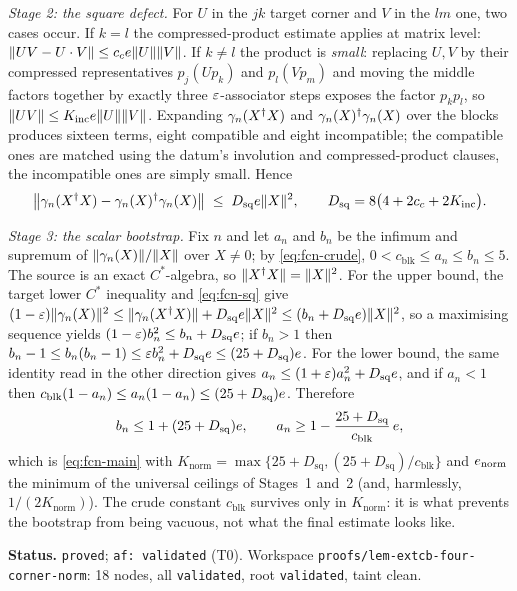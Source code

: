 \emph{Stage 2: the square defect.} For $U$ in the $jk$ target corner and $V$ in the $lm$
one, two cases occur. If $k=l$ the compressed-product estimate applies at matrix level:
$\lVert UV-U\mathbin{\cdot} V\rVert\le c_ce\lVert U\rVert\lVert V\rVert$. If $k\ne l$ the product is \emph{small}:
replacing $U,V$ by their compressed representatives $p_j(Up_k)$ and $p_l(Vp_m)$ and moving
the middle factors together by exactly three $\varepsilon$-associator steps exposes the factor
$p_kp_l$, so $\lVert UV\rVert\le K_{\mathrm{inc}}e\lVert U\rVert\lVert V\rVert$. Expanding
$\gamma_n(X^{\dagger} X)$ and $\gamma_n(X)^{\dagger}\gamma_n(X)$ over the blocks produces sixteen terms,
eight compatible and eight incompatible; the compatible ones are matched using the datum's
involution and compressed-product clauses, the incompatible ones are simply small. Hence
\begin{equation}\label{eq:fcn-sq}
  \bigl\lVert\gamma_n(X^{\dagger} X)-\gamma_n(X)^{\dagger}\gamma_n(X)\bigr\rVert\;\le\;D_{\mathrm{sq}}e\lVert X\rVert^{2},
  \qquad D_{\mathrm{sq}}=8\bigl(4+2c_c+2K_{\mathrm{inc}}\bigr).
\end{equation}

\emph{Stage 3: the scalar bootstrap.} Fix $n$ and let $a_n$ and $b_n$ be the infimum and
supremum of $\lVert \gamma_n(X)\rVert/\lVert X\rVert$ over $X\ne0$; by \eqref{eq:fcn-crude},
$0<c_{\mathrm{blk}}\le a_n\le b_n\le5$. The source is an exact $C^*$-algebra, so
$\lVert X^{\dagger} X\rVert=\lVert X\rVert^{2}$. For the upper bound, the target lower $C^*$ inequality and
\eqref{eq:fcn-sq} give
$(1-\varepsilon)\lVert \gamma_n(X)\rVert^{2}\le\lVert \gamma_n(X^{\dagger} X)\rVert+D_{\mathrm{sq}}e\lVert X\rVert^{2}
\le(b_n+D_{\mathrm{sq}}e)\lVert X\rVert^{2}$, so a maximising sequence yields
$(1-\varepsilon)b_n^{2}\le b_n+D_{\mathrm{sq}}e$; if $b_n>1$ then
$b_n-1\le b_n(b_n-1)\le\varepsilon b_n^{2}+D_{\mathrm{sq}}e\le(25+D_{\mathrm{sq}})e$.
For the lower bound, the same identity read in the other direction gives
$a_n\le(1+\varepsilon)a_n^{2}+D_{\mathrm{sq}}e$, and if $a_n<1$ then
$c_{\mathrm{blk}}(1-a_n)\le a_n(1-a_n)\le(25+D_{\mathrm{sq}})e$. Therefore
\[
  b_n\le1+(25+D_{\mathrm{sq}})e,
  \qquad
  a_n\ge1-\frac{25+D_{\mathrm{sq}}}{c_{\mathrm{blk}}}\,e ,
\]
which is \eqref{eq:fcn-main} with
$K_{\mathrm{norm}}=\max\{25+D_{\mathrm{sq}},(25+D_{\mathrm{sq}})/c_{\mathrm{blk}}\}$ and
$e_{\mathrm{norm}}$ the minimum of the universal ceilings of Stages~1 and~2 (and,
harmlessly, $1/(2K_{\mathrm{norm}})$). The crude constant $c_{\mathrm{blk}}$ survives only
in $K_{\mathrm{norm}}$: it is what prevents the bootstrap from being vacuous, not what the
final estimate looks like.

\medskip
\noindent\textbf{Status.} \texttt{proved}; \texttt{af: validated} (T0). Workspace
\texttt{proofs/lem-extcb-four-corner-norm}: 18 nodes, all \texttt{validated}, root
\texttt{validated}, taint clean.

